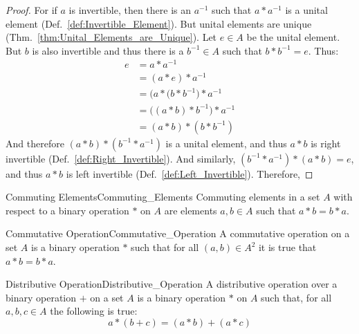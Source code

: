     \begin{proof}
        For if $a$ is invertible, then there is an $a^{\minus{1}}$ such that
        $a*a^{\minus{1}}$ is a unital element
        (Def.~\ref{def:Invertible_Element}). But unital elements are unique
        (Thm.~\ref{thm:Unital_Elements_are_Unique}). Let $e\in{A}$ be the unital
        element. But $b$ is also invertible and thus there is a
        $b^{\minus{1}}\in{A}$ such that $b*b^{\minus{1}}=e$. Thus:
        \begin{align}
            e&=a*a^{\minus{1}}
            \tag{Inverse Property}\\
            &=(a*e)*a^{\minus{1}}
            \tag{Identity}\\
            &=\big(a*(b*b^{\minus{1}}\big)*a^{\minus{1}}
            \tag{Inverse Property}\\
            &=\big((a*b)*b^{\minus{1}}\big)*a^{\minus{1}}
            \tag{Associativity}\\
            &=(a*b)*(b*b^{\minus{1}})
            \tag{Associativity}
        \end{align}
        And therefore $(a*b)*(b^{\minus{1}}*a^{\minus{1}})$ is a unital element,
        and thus $a*b$ is right invertible (Def.~\ref{def:Right_Invertible}).
        And similarly, $(b^{\minus{1}}*a^{\minus{1}})*(a*b)=e$, and thus
        $a*b$ is left invertible (Def.~\ref{def:Left_Invertible}). Therefore,
    \end{proof}
    \begin{fdefinition}{Commuting Elements}{Commuting_Elements}
        Commuting elements in a \gls{set} $A$ with respect to a
        \gls{binary operation} $*$ on $A$ are elements $a,b\in{A}$ such that
        $a*b=b*a$.
    \end{fdefinition}
    \begin{fdefinition}{Commutative Operation}{Commutative_Operation}
        A \gls{commutative operation} on a \gls{set} $A$ is a
        \gls{binary operation} $*$ such that for all $(a,b)\in{A}^{2}$ it is
        true that $a*b=b*a$.
    \end{fdefinition}
    \begin{fdefinition}{Distributive Operation}{Distributive_Operation}
        A distributive operation over a \gls{binary operation} $+$ on a
        \gls{set} $A$ is a binary operation $*$ on $A$ such that, for all
        $a,b,c\in{A}$ the following is true:
        \begin{equation*}
            a*(b+c)=(a*b)+(a*c)
        \end{equation*}
    \end{fdefinition}